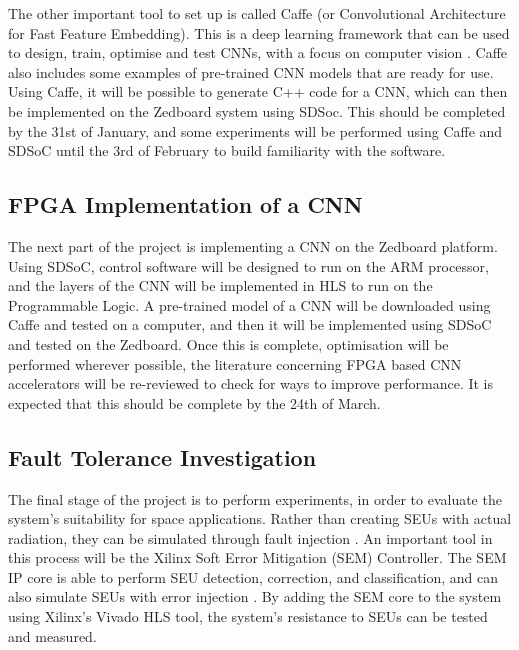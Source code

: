 \documentclass[12pt]{article}
\begin{document}
The other important tool to set up is called Caffe (or Convolutional Architecture for Fast Feature Embedding). This is a deep learning framework that can be used to design, train, optimise and test CNNs, with a focus on computer vision \cite{jia2014caffe}. Caffe also includes some examples of pre-trained CNN models that are ready for use. Using Caffe, it will be possible to generate C++ code for a CNN, which can then be implemented on the Zedboard system using SDSoc. This should be completed by the 31st of January, and some experiments will be performed using Caffe and SDSoC until the 3rd of February to build familiarity with the software.

\subsection{FPGA Implementation of a CNN}
\label{sec:Imp-FPGAImplOfCnn}
\vspace{-12pt}

The next part of the project is implementing a CNN on the Zedboard platform. Using SDSoC, control software will be designed to run on the ARM processor, and the layers of the CNN will be implemented in HLS to run on the Programmable Logic. A pre-trained model of a CNN will be downloaded using Caffe and tested  on a computer, and then it will be implemented using SDSoC and tested on the Zedboard. Once this is complete, optimisation will be performed wherever possible, the literature concerning FPGA based CNN accelerators will be re-reviewed to check for ways to improve performance. It is expected that this should be complete by the 24th of March.

\subsection{Fault Tolerance Investigation}
\label{sec:Imp-FaultTolInv}
\vspace{-12pt}

The final stage of the project is to perform experiments, in order to evaluate the system's suitability for space applications. Rather than creating SEUs with actual radiation, they can be simulated through fault injection \cite{FaultInjection}. An important tool in this process will be the Xilinx Soft Error Mitigation (SEM) Controller. The SEM IP core is able to perform SEU detection, correction, and classification, and can also simulate SEUs with error injection \cite{ManualSEM}. By adding the SEM core to the system using Xilinx's Vivado HLS tool, the system's resistance to SEUs can be tested and measured. 
\end{document}
